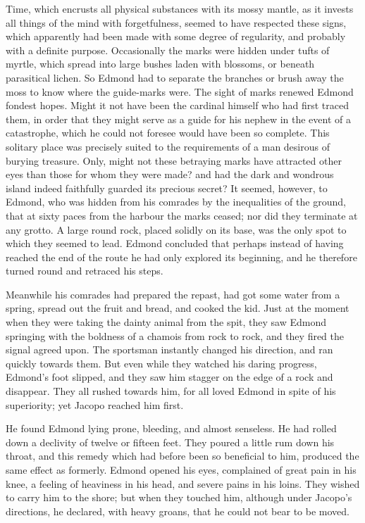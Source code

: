  Time, which encrusts all physical substances with its mossy mantle, as it invests all things of the mind with forgetfulness, seemed to have respected these signs, which apparently had been made with some degree of regularity, and probably with a definite purpose. Occasionally the marks were hidden under tufts of myrtle, which spread into large bushes laden with blossoms, or beneath parasitical lichen. So Edmond had to separate the branches or brush away the moss to know where the guide-marks were. The sight of marks renewed Edmond fondest hopes. Might it not have been the cardinal himself who had first traced them, in order that they might serve as a guide for his nephew in the event of a catastrophe, which he could not foresee would have been so complete. This solitary place was precisely suited to the requirements of a man desirous of burying treasure. Only, might not these betraying marks have attracted other eyes than those for whom they were made? and had the dark and wondrous island indeed faithfully guarded its precious secret?  It seemed, however, to Edmond, who was hidden from his comrades by the inequalities of the ground, that at sixty paces from the harbour the marks ceased; nor did they terminate at any grotto. A large round rock, placed solidly on its base, was the only spot to which they seemed to lead. Edmond concluded that perhaps instead of having reached the end of the route he had only explored its beginning, and he therefore turned round and retraced his steps. 

 Meanwhile his comrades had prepared the repast, had got some water from a spring, spread out the fruit and bread, and cooked the kid. Just at the moment when they were taking the dainty animal from the spit, they saw Edmond springing with the boldness of a chamois from rock to rock, and they fired the signal agreed upon. The sportsman instantly changed his direction, and ran quickly towards them. But even while they watched his daring progress, Edmond's foot slipped, and they saw him stagger on the edge of a rock and disappear. They all rushed towards him, for all loved Edmond in spite of his superiority; yet Jacopo reached him first. 

 He found Edmond lying prone, bleeding, and almost senseless. He had rolled down a declivity of twelve or fifteen feet. They poured a little rum down his throat, and this remedy which had before been so beneficial to him, produced the same effect as formerly. Edmond opened his eyes, complained of great pain in his knee, a feeling of heaviness in his head, and severe pains in his loins. They wished to carry him to the shore; but when they touched him, although under Jacopo's directions, he declared, with heavy groans, that he could not bear to be moved. 

